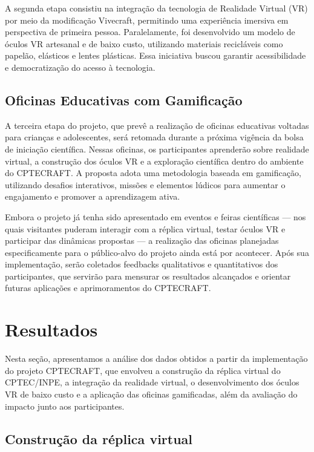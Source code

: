 A segunda etapa consistiu na integração da tecnologia de Realidade Virtual (VR) por meio da modificação Vivecraft, permitindo uma experiência imersiva em perspectiva de primeira pessoa. Paralelamente, foi desenvolvido um modelo de óculos VR artesanal e de baixo custo, utilizando materiais recicláveis como papelão, elásticos e lentes plásticas. Essa iniciativa buscou garantir acessibilidade e democratização do acesso à tecnologia.

\subsection{Oficinas Educativas com Gamificação}

A terceira etapa do projeto, que prevê a realização de oficinas educativas voltadas para crianças e adolescentes, será retomada durante a próxima vigência da bolsa de iniciação científica. Nessas oficinas, os participantes aprenderão sobre realidade virtual, a construção dos óculos VR e a exploração científica dentro do ambiente do CPTECRAFT. A proposta adota uma metodologia baseada em gamificação, utilizando desafios interativos, missões e elementos lúdicos para aumentar o engajamento e promover a aprendizagem ativa.

Embora o projeto já tenha sido apresentado em eventos e feiras científicas — nos quais visitantes puderam interagir com a réplica virtual, testar óculos VR e participar das dinâmicas propostas — a realização das oficinas planejadas especificamente para o público-alvo do projeto ainda está por acontecer. Após sua implementação, serão coletados feedbacks qualitativos e quantitativos dos participantes, que servirão para mensurar os resultados alcançados e orientar futuras aplicações e aprimoramentos do CPTECRAFT.

\section{Resultados}

Nesta seção, apresentamos a análise dos dados obtidos a partir da implementação do projeto CPTECRAFT, que envolveu a construção da réplica virtual do CPTEC/INPE, a integração da realidade virtual, o desenvolvimento dos óculos VR de baixo custo e a aplicação das oficinas gamificadas, além da avaliação do impacto junto aos participantes.

\subsection{Construção da réplica virtual}

